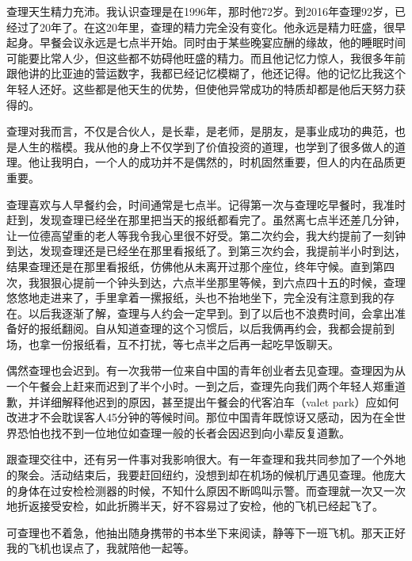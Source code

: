 查理天生精力充沛。我认识查理是在1996年，那时他72岁。到2016年查理92岁，已经过了20年了。在这20年里，查理的精力完全没有变化。他永远是精力旺盛，很早起身。早餐会议永远是七点半开始。同时由于某些晚宴应酬的缘故，他的睡眠时间可能要比常人少，但这些都不妨碍他旺盛的精力。而且他记忆力惊人，我很多年前跟他讲的比亚迪的营运数字，我都已经记忆模糊了，他还记得。他的记忆比我这个年轻人还好。这些都是他天生的优势，但使他异常成功的特质却都是他后天努力获得的。
\par

查理对我而言，不仅是合伙人，是长辈，是老师，是朋友，是事业成功的典范，也是人生的楷模。我从他的身上不仅学到了价值投资的道理，也学到了很多做人的道理。他让我明白，一个人的成功并不是偶然的，时机固然重要，但人的内在品质更重要。
\par

查理喜欢与人早餐约会，时间通常是七点半。记得第一次与查理吃早餐时，我准时赶到，发现查理已经坐在那里把当天的报纸都看完了。虽然离七点半还差几分钟，让一位德高望重的老人等我令我心里很不好受。第二次约会，我大约提前了一刻钟到达，发现查理还是已经坐在那里看报纸了。到第三次约会，我提前半小时到达，结果查理还是在那里看报纸，仿佛他从未离开过那个座位，终年守候。直到第四次，我狠狠心提前一个钟头到达，六点半坐那里等候，到六点四十五的时候，查理悠悠地走进来了，手里拿着一摞报纸，头也不抬地坐下，完全没有注意到我的存在。以后我逐渐了解，查理与人约会一定早到。到了以后也不浪费时间，会拿出准备好的报纸翻阅。自从知道查理的这个习惯后，以后我俩再约会，我都会提前到场，也拿一份报纸看，互不打扰，等七点半之后再一起吃早饭聊天。
\par

偶然查理也会迟到。有一次我带一位来自中国的青年创业者去见查理。查理因为从一个午餐会上赶来而迟到了半个小时。一到之后，查理先向我们两个年轻人郑重道歉，并详细解释他迟到的原因，甚至提出午餐会的代客泊车（valet park）应如何改进才不会耽误客人45分钟的等候时间。那位中国青年既惊讶又感动，因为在全世界恐怕也找不到一位地位如查理一般的长者会因迟到向小辈反复道歉。
\par

跟查理交往中，还有另一件事对我影响很大。有一年查理和我共同参加了一个外地的聚会。活动结束后，我要赶回纽约，没想到却在机场的候机厅遇见查理。他庞大的身体在过安检检测器的时候，不知什么原因不断鸣叫示警。而查理就一次又一次地折返接受安检，如此折腾半天，好不容易过了安检，他的飞机已经起飞了。
\par

可查理也不着急，他抽出随身携带的书本坐下来阅读，静等下一班飞机。那天正好我的飞机也误点了，我就陪他一起等。
\par

